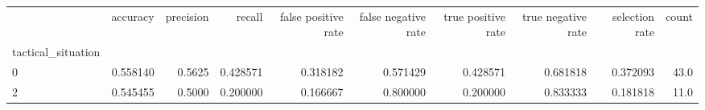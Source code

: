 \begin{tabular}{lrrrrrrrrr}
\toprule
{} &  accuracy &  precision &    recall &  false positive rate &  false negative rate &  true positive rate &  true negative rate &  selection rate &  count \\
tactical\_situation &           &            &           &                      &                      &                     &                     &                 &        \\
\midrule
0                  &  0.558140 &     0.5625 &  0.428571 &             0.318182 &             0.571429 &            0.428571 &            0.681818 &        0.372093 &   43.0 \\
2                  &  0.545455 &     0.5000 &  0.200000 &             0.166667 &             0.800000 &            0.200000 &            0.833333 &        0.181818 &   11.0 \\
\bottomrule
\end{tabular}
